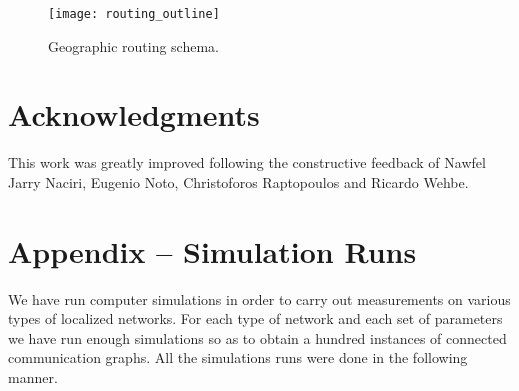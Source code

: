 \documentclass{article}
\begin{document}
\begin{figure}[ħtb]
\begin{center}
\texttt{[image: routing\_outline]}
\caption{Geographic routing schema.}
\label{fig_outline}
\end{center}
\end{figure}

\section*{Acknowledgments}
This work was greatly improved following the constructive feedback of Nawfel Jarry Naciri, Eugenio Noto, Christoforos Raptopoulos and Ricardo Wehbe.

\newpage



\newpage
\appendix
\section*{Appendix -- Simulation Runs}
We have run computer simulations in order to carry out measurements on various types of localized networks. For each type of network and each set of parameters we have run enough simulations so as to obtain a hundred instances of connected communication graphs.
All the simulations runs were done in the following manner.
\end{document}
